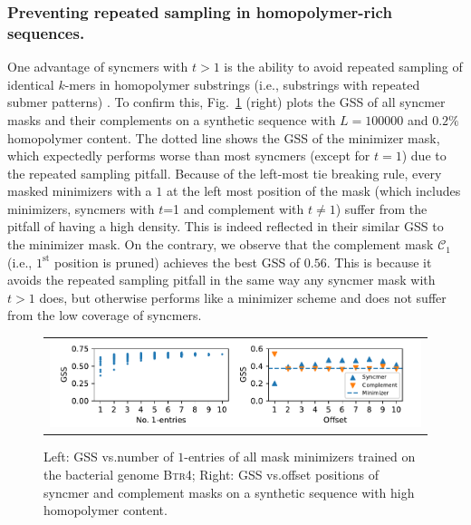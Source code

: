 \subsubsection{Preventing repeated sampling in homopolymer-rich sequences.} One advantage of syncmers with $t>1$ is the ability to avoid repeated sampling of identical $k$-mers in homopolymer substrings (i.e., substrings with repeated submer patterns) \cite{edgar2021syncmers}. To confirm this, Fig.~\ref{fig:4} (right) plots the GSS of all syncmer masks and their complements on a synthetic sequence with $L=100000$ and $0.2\%$ homopolymer content. The dotted line shows the GSS of the minimizer mask, which expectedly  performs worse than most syncmers (except for $t=1$) due to the repeated sampling pitfall. Because of the left-most tie breaking rule, every masked minimizers with a $1$ at the left most position of the mask (which includes minimizers, syncmers with $t$=1 and complement with $t \ne 1$) suffer from the pitfall of having a high density. This is indeed reflected in their similar GSS to the minimizer mask. On the contrary, we observe that the complement mask $\mathcal{C}_{1}$ (i.e., $1^{\text{st}}$ position is pruned) achieves the best GSS of $0.56$. This is because it avoids the repeated sampling pitfall in the same way any syncmer mask with $t>1$ does, but otherwise performs like a minimizer scheme and does not suffer from the low coverage of syncmers.

\begin{figure}[ht]
\centering
\begin{tabular}{c}
\hspace{-1.5mm}\includegraphics[scale=0.98]{masked_mnz_plots/fig4/exp78.pdf}
\end{tabular}
\caption{Left: GSS vs.\@ number of $1$-entries of all mask minimizers trained on the bacterial genome \textsc{Btr4}; Right: GSS vs.\@ offset positions of syncmer and complement masks on a synthetic sequence with high homopolymer content.}
\label{fig:4}
\end{figure}

